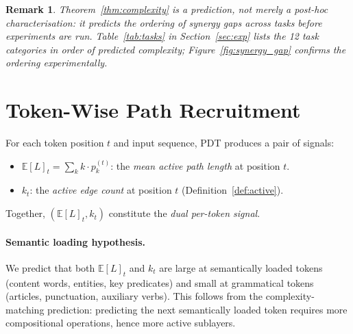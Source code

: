 \documentclass{article}
\newtheorem{remark}{Remark}
\newcommand{\E}{\mathbb{E}}
\begin{document}
\begin{remark}
Theorem~\ref{thm:complexity} is a \emph{prediction}, not merely a post-hoc
characterisation: it predicts the ordering of synergy gaps across tasks before
experiments are run.  Table~\ref{tab:tasks} in Section~\ref{sec:exp} lists the 12
task categories in order of predicted complexity; Figure~\ref{fig:synergy_gap}
confirms the ordering experimentally.
\end{remark}

\section{Token-Wise Path Recruitment}
\label{sec:token}

For each token position $t$ and input sequence, PDT produces a pair of signals:
\begin{itemize}
  \item $\E[L]_t = \sum_k k \cdot p^{(t)}_k$: the \emph{mean active path length}
        at position $t$.
  \item $k_t$: the \emph{active edge count} at position $t$
        (Definition~\ref{def:active}).
\end{itemize}
Together, $(\E[L]_t, k_t)$ constitute the \emph{dual per-token signal}.

\paragraph{Semantic loading hypothesis.}
We predict that both $\E[L]_t$ and $k_t$ are large at semantically loaded tokens
(content words, entities, key predicates) and small at grammatical tokens (articles,
punctuation, auxiliary verbs).  This follows from the complexity-matching prediction:
predicting the next semantically loaded token requires more compositional operations,
hence more active sublayers.
\end{document}
